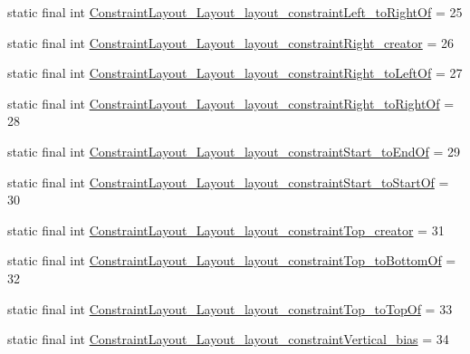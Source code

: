 \begin{DoxyCompactItemize}
static final int \mbox{\hyperlink{classandroid_1_1support_1_1constraint_1_1R_1_1styleable_a995a9a19a8260e505d7fed114338fdba}{Constraint\+Layout\+\_\+\+Layout\+\_\+layout\+\_\+constraint\+Left\+\_\+to\+Right\+Of}} = 25
\item 
static final int \mbox{\hyperlink{classandroid_1_1support_1_1constraint_1_1R_1_1styleable_aff97e3e343064ece1e4070c2d2d11ee2}{Constraint\+Layout\+\_\+\+Layout\+\_\+layout\+\_\+constraint\+Right\+\_\+creator}} = 26
\item 
static final int \mbox{\hyperlink{classandroid_1_1support_1_1constraint_1_1R_1_1styleable_a0b08809a206ee9b0b7c4b63901aa402b}{Constraint\+Layout\+\_\+\+Layout\+\_\+layout\+\_\+constraint\+Right\+\_\+to\+Left\+Of}} = 27
\item 
static final int \mbox{\hyperlink{classandroid_1_1support_1_1constraint_1_1R_1_1styleable_ab52d8b77898c02fdb3d0f1a23c92e586}{Constraint\+Layout\+\_\+\+Layout\+\_\+layout\+\_\+constraint\+Right\+\_\+to\+Right\+Of}} = 28
\item 
static final int \mbox{\hyperlink{classandroid_1_1support_1_1constraint_1_1R_1_1styleable_af7db8d13ff13f117fc8893c3db46ea7c}{Constraint\+Layout\+\_\+\+Layout\+\_\+layout\+\_\+constraint\+Start\+\_\+to\+End\+Of}} = 29
\item 
static final int \mbox{\hyperlink{classandroid_1_1support_1_1constraint_1_1R_1_1styleable_aa85769983cb73acd4746b134d3d495bc}{Constraint\+Layout\+\_\+\+Layout\+\_\+layout\+\_\+constraint\+Start\+\_\+to\+Start\+Of}} = 30
\item 
static final int \mbox{\hyperlink{classandroid_1_1support_1_1constraint_1_1R_1_1styleable_a4bd718b50f6aec4f1d229bb10898ff08}{Constraint\+Layout\+\_\+\+Layout\+\_\+layout\+\_\+constraint\+Top\+\_\+creator}} = 31
\item 
static final int \mbox{\hyperlink{classandroid_1_1support_1_1constraint_1_1R_1_1styleable_a805ecc66fe3499b9e077691208ca4e16}{Constraint\+Layout\+\_\+\+Layout\+\_\+layout\+\_\+constraint\+Top\+\_\+to\+Bottom\+Of}} = 32
\item 
static final int \mbox{\hyperlink{classandroid_1_1support_1_1constraint_1_1R_1_1styleable_a37a8c94b6aaf49b9df53c61543035fa5}{Constraint\+Layout\+\_\+\+Layout\+\_\+layout\+\_\+constraint\+Top\+\_\+to\+Top\+Of}} = 33
\item 
static final int \mbox{\hyperlink{classandroid_1_1support_1_1constraint_1_1R_1_1styleable_a3266cec39eab4572274a0d18442a18ca}{Constraint\+Layout\+\_\+\+Layout\+\_\+layout\+\_\+constraint\+Vertical\+\_\+bias}} = 34
\item 

\end{DoxyCompactItemize}
